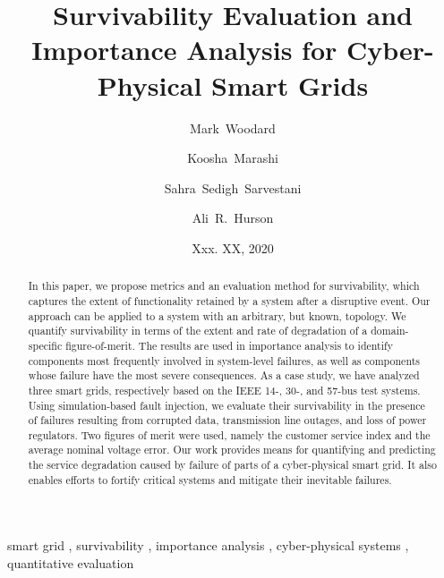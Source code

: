 \documentclass[review]{elsarticle}
\begin{document}
\begin{frontmatter}

\title{Survivability Evaluation and Importance Analysis for Cyber-Physical Smart Grids}

\author[sandia]{Mark~Woodard}

\author[romeo]{Koosha~Marashi}

\author[s_and_t]{Sahra~Sedigh~Sarvestani}

\author[s_and_t]{Ali~R.~Hurson}


\address[sandia]{Sandia National Laboratories, Albuquerque, NM 87185, USA}
\address[romeo]{Romeo Power Technology, Vernon, CA 90058, USA}
\address[s_and_t]{Missouri University of Science and Technology, Rolla, MO 65409, USA}

\date{Xxx. XX, 2020}

\begin{abstract}
In this paper, we propose metrics and an evaluation method for survivability, which captures the extent of functionality retained by a system after a disruptive event. Our approach can be applied to a system with an arbitrary, but known, topology. We quantify survivability in terms of the extent and rate of degradation of a domain-specific figure-of-merit. The results are used in importance analysis to identify components most frequently involved in system-level failures, as well as components whose failure have the most severe consequences. As a case study, we have analyzed three smart grids, respectively based on the IEEE 14-, 30-, and 57-bus test systems. Using simulation-based fault injection, we evaluate their survivability in the presence of failures resulting from corrupted data, transmission line outages, and loss of power regulators. Two figures of merit were used, namely the customer service index and the average nominal voltage error. Our work provides means for quantifying and predicting the service degradation caused by failure of parts of a cyber-physical smart grid. It also enables efforts to fortify critical systems and mitigate their inevitable failures.
\end{abstract}

%

\begin{keyword}
smart grid \sep
survivability \sep
importance analysis \sep
cyber-physical systems \sep
quantitative evaluation
\end{keyword}

\end{frontmatter}
\end{document}
